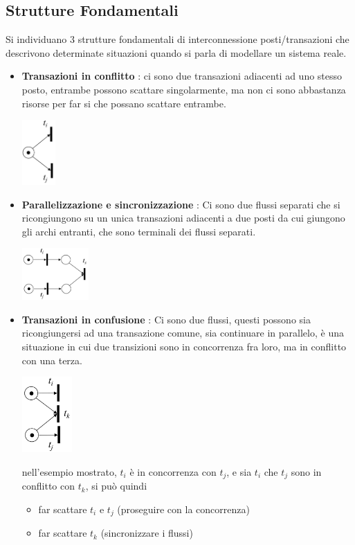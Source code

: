 \documentclass[10pt, letterpaper]{report}
\begin{document}
\subsection{Strutture Fondamentali}
Si individuano 3 strutture fondamentali di interconnessione posti/transazioni che descrivono determinate situazioni quando si parla di modellare un sistema reale.\begin{itemize}
    \item \textbf{Transazioni in conflitto} : ci sono due transazioni adiacenti ad uno stesso posto, entrambe possono scattare singolarmente, ma non ci sono abbastanza risorse per far si che possano scattare entrambe.
     \begin{center}
        \includegraphics[width=0.1\textwidth]{images/conflitto.png}
    \end{center}
    \item \textbf{Parallelizzazione e sincronizzazione} : Ci sono due flussi separati che si ricongiungono su un unica transazioni adiacenti a due posti da cui giungono gli archi entranti, che sono terminali dei flussi separati. \begin{center}
        \includegraphics[width=0.2\textwidth]{images/petriSincronia.png}
    \end{center}
    \item \textbf{Transazioni in confusione} : Ci sono due flussi, questi possono sia ricongiungersi ad una transazione comune, sia continuare in parallelo, è una situazione in cui due transizioni sono in concorrenza fra loro, ma in conflitto con una terza.\begin{center}
        \includegraphics[width=0.15\textwidth]{images/alternativa.png}
    \end{center}
    nell'esempio mostrato, $t_i$ è in concorrenza con $t_j$, e sia $t_i$ che $t_j$ sono in conflitto con $t_k$, si può quindi\begin{itemize}
        \item far scattare $t_i$ e $t_j$ (proseguire con la concorrenza)
        \item far scattare $t_k$ (sincronizzare i flussi)
    \end{itemize}
\end{itemize}
\flowerLine 
\end{document}
